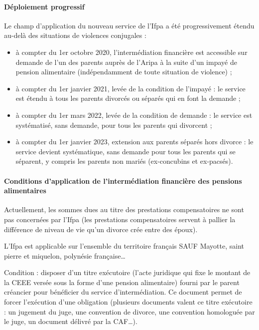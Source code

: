 \documentclass{article}
\begin{document}
\paragraph{Déploiement progressif}
Le champ d'application du nouveau service de l'Ifpa a été progressivement étendu au-delà des situations de violences conjugales :
\begin{itemize}
    \item à compter du 1er octobre 2020, l'intermédiation financière est accessible sur demande de l'un des parents auprès de l'Aripa à la suite d'un impayé de pension alimentaire (indépendamment de toute situation de violence) ;
    \item à compter du 1er janvier 2021, levée de la condition de l'impayé : le service est étendu à tous les parents divorcés ou séparés qui en font la demande ;
    \item à compter du 1er mars 2022, levée de la condition de demande : le service est systématisé, sans demande, pour tous les parents qui divorcent ;
    \item à compter du 1er janvier 2023, extension aux parents séparés hors divorce : le service devient systématique, sans demande pour tous les parents qui se séparent, y compris les parents non mariés (ex-concubins et ex-pacsés).
\end{itemize}
 
\paragraph{Conditions d'application de l'intermédiation financière des pensions alimentaires}
Actuellement, les sommes dues au titre des prestations compensatoires ne sont pas concernées par l'Ifpa (les prestations compensatoires servent à pallier la différence de niveau de vie qu'un divorce crée entre des époux).
 
\medskip
\noindent L'Ifpa est applicable sur l'ensemble du territoire français SAUF Mayotte, saint pierre et miquelon, polynésie française\dots
 
\medskip
\noindent Condition : disposer d'un titre exécutoire (l'acte juridique qui fixe le montant de la CEEE versée sous la forme d'une pension alimentaire) fourni par le parent créancier pour bénéficier du service d'intermédiation. Ce document permet de forcer l'exécution d'une obligation (plusieurs documents valent ce titre exécutoire : un jugement du juge, une convention de divorce, une convention homologuée par le juge, un document délivré par la CAF\dots).
 
\end{document}

